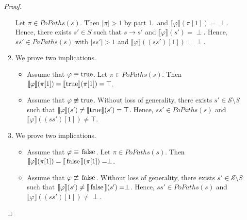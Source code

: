 \documentclass[12pt]{article}
\newcommand{\TRUE}{\mbox{\lstinline{true}}}
\newcommand{\FALSE}{\mbox{\lstinline{false}}}
\theoremstyle{definition}
\newcommand{\satisfaction}[1]{\llbracket #1 \rrbracket}
\newenvironment{franck}{\color{red}}{\color{black}}
\begin{document}
\begin{franck}
\begin{proof}
\begin{enumerate}
\[\]
Let $\pi \in \mathit{PoPaths}(s)$.  Then $|\pi| > 1$ by part 1.\ and $\satisfaction{\varphi}(\pi[1]) = \perp$.  Hence, there exists $s' \in S$ such that $s \rightarrow s'$ and $\satisfaction{\varphi}(s') = \perp$.  Hence, $s s' \in \mathit{PaPaths}(s)$ with $|s s'| > 1$ and $\satisfaction{\varphi}((s s')[1]) = \perp$.
\item
We prove two implications.
\begin{itemize}
\item 
Assume that $\varphi \equiv \TRUE$.  Let $\pi \in \mathit{PoPaths}(s)$.  Then $\satisfaction{\varphi}(\pi[1]) = \satisfaction{\TRUE}(\pi[1]) = \top$.
\item
Assume that $\varphi \not\equiv \TRUE$.  Without loss of generality, there exists $s' \in \mathcal{S} \setminus S$ such that $\satisfaction{\varphi}(s') \not= \satisfaction{\TRUE}(s') = \top$.  Hence, $s s' \in \mathit{PoPaths}(s)$ and $\satisfaction{\varphi}((s s')[1]) \not= \top$.
\end{itemize}
\item
We prove two implications.
\begin{itemize}
\item 
Assume that $\varphi \equiv \FALSE$.  Let $\pi \in \mathit{PoPaths}(s)$.  Then $\satisfaction{\varphi}(\pi[1]) = \satisfaction{\FALSE}(\pi[1]) = \perp$.
\item
Assume that $\varphi \not\equiv \FALSE$.  Without loss of generality, there exists $s' \in \mathcal{S} \setminus S$ such that $\satisfaction{\varphi}(s') \not= \satisfaction{\FALSE}(s') = \perp$.  Hence, $s s' \in \mathit{PoPaths}(s)$ and $\satisfaction{\varphi}((s s')[1]) \not= \perp$.
\end{itemize}
\end{enumerate}
\end{proof}


\end{franck}
\end{document}
